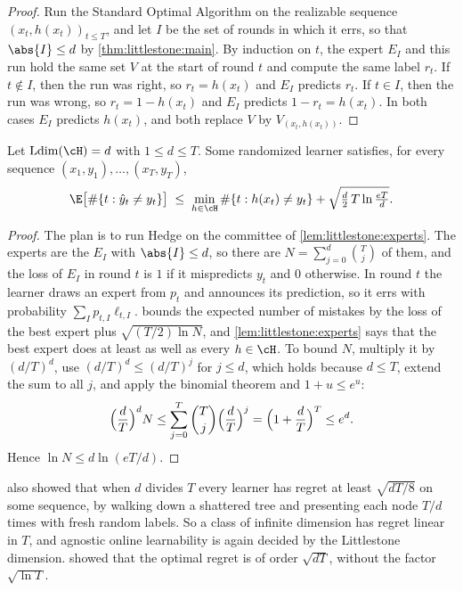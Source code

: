 \begin{refsection}
\begin{proof}
Run the Standard Optimal Algorithm on the realizable sequence $(x_t,h(x_t))_{t\le T}$, and let $I$ be the set of rounds in which it errs, so that $\abs{I}\le d$ by \cref{thm:littlestone:main}. By induction on $t$, the expert $E_I$ and this run hold the same set $V$ at the start of round $t$ and compute the same label $r_t$. If $t\notin I$, then the run was right, so $r_t=h(x_t)$ and $E_I$ predicts $r_t$. If $t\in I$, then the run was wrong, so $r_t=1-h(x_t)$ and $E_I$ predicts $1-r_t=h(x_t)$. In both cases $E_I$ predicts $h(x_t)$, and both replace $V$ by $V_{(x_t,h(x_t))}$.
\end{proof}

\begin{theorem}\label{thm:littlestone:agnostic}
Let $\littlestoneLdim(\cH)=d$ with $1\le d\le T$. Some randomized learner satisfies, for every sequence $(x_1,y_1),\dots,(x_T,y_T)$,
\[
  \E\bigl[\#\{t:\hat y_t\ne y_t\}\bigr]\;\le\;\min_{h\in\cH}\#\{t:h(x_t)\ne y_t\}+\sqrt{\tfrac{d}{2}\,T\ln\tfrac{eT}{d}}.
\]
\end{theorem}

\begin{proof}
The plan is to run Hedge on the committee of \cref{lem:littlestone:experts}. The experts are the $E_I$ with $\abs{I}\le d$, so there are $N=\sum_{j=0}^d\binom{T}{j}$ of them, and the loss of $E_I$ in round $t$ is $1$ if it mispredicts $y_t$ and $0$ otherwise. In round $t$ the learner draws an expert from $p_t$ and announces its prediction, so it errs with probability $\sum_I p_{t,I}\ell_{t,I}$.  bounds the expected number of mistakes by the loss of the best expert plus $\sqrt{(T/2)\ln N}$, and \cref{lem:littlestone:experts} says that the best expert does at least as well as every $h\in\cH$. To bound $N$, multiply it by $(d/T)^d$, use $(d/T)^d\le(d/T)^j$ for $j\le d$, which holds because $d\le T$, extend the sum to all $j$, and apply the binomial theorem and $1+u\le e^u$:
\[
  \Bigl(\frac{d}{T}\Bigr)^{d}N\le\sum_{j=0}^{T}\binom{T}{j}\Bigl(\frac{d}{T}\Bigr)^{j}=\Bigl(1+\frac{d}{T}\Bigr)^{T}\le e^{d}.
\]
Hence $\ln N\le d\ln(eT/d)$.
\end{proof}

\Textcite{BenDavidPalShalevShwartz2009} also showed that when $d$ divides $T$ every learner has regret at least $\sqrt{dT/8}$ on some sequence, by walking down a shattered tree and presenting each node $T/d$ times with fresh random labels. So a class of infinite dimension has regret linear in $T$, and agnostic online learnability is again decided by the Littlestone dimension. \Textcite{AlonEtAl2021} showed that the optimal regret is of order $\sqrt{dT}$, without the factor $\sqrt{\ln T}$.


\end{refsection}

